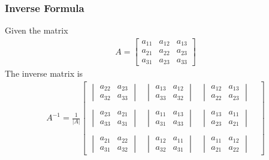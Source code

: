 \documentclass[10pt,a4paper]{book}
\theoremstyle{definition}\newtheorem{definition}{Definition}
\theoremstyle{definition}\newtheorem{fact}{Fact}
\theoremstyle{definition}\newtheorem{ex}{Ex.}
\theoremstyle{definition}\newtheorem{project}{Project}
\theoremstyle{definition}\newtheorem{problem}{Problem}
\theoremstyle{definition}\newtheorem{example}{Example}
\numberwithin{theorem}{chapter}
\numberwithin{corollary}{chapter}
\numberwithin{assumption}{chapter}
\numberwithin{definition}{chapter}
\numberwithin{prop}{chapter}
\numberwithin{notation}{chapter}
\numberwithin{problem}{chapter}
\numberwithin{example}{chapter}
\numberwithin{fact}{chapter}
\numberwithin{ex}{chapter}
\begin{document}
	\subsubsection{Inverse Formula}
	Given the matrix
	\begin{align*}
		A = 
		\begin{bmatrix}
			a_{11} & a_{12} & a_{13} \\
			a_{21} & a_{22} & a_{23} \\
			a_{31} & a_{23} & a_{33}
		\end{bmatrix}
	\end{align*}
	The inverse matrix is
	\begin{align*}
		A^{-1} = \frac{1}{|A|} 
		\begin{bmatrix}
			\begin{vmatrix}
				a_{22} & a_{23} \\ a_{32} & a_{33}
			\end{vmatrix} &
			\begin{vmatrix}
				a_{13} & a_{12} \\ a_{33} & a_{32}
			\end{vmatrix} &
			\begin{vmatrix}
				a_{12} & a_{13} \\ a_{22} & a_{23}
			\end{vmatrix} \\
			& & & \\
			\begin{vmatrix}
				a_{23} & a_{21} \\ a_{33} & a_{31} 
			\end{vmatrix} & 
			\begin{vmatrix}
				a_{11} & a_{13} \\ a_{31} & a_{33}
			\end{vmatrix} &
			\begin{vmatrix}
				a_{13} & a_{11} \\ a_{23} & a_{21}
			\end{vmatrix} \\
			& & & \\
			\begin{vmatrix}
				a_{21} & a_{22} \\ a_{31} & a_{32}
			\end{vmatrix} &
			\begin{vmatrix}
				a_{12} & a_{11} \\ a_{32} & a_{31}
			\end{vmatrix} &
			\begin{vmatrix}
				a_{11} & a_{12} \\ a_{21} & a_{22}
			\end{vmatrix}
		\end{bmatrix}
	\end{align*}
	
\end{document}
